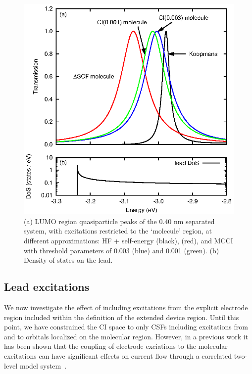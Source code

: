 \begin{figure}
	\begin{center}
		\includegraphics[width=0.9\linewidth]{figures/figure7a_7b}
	\end{center}
	\caption{(a) LUMO region quasiparticle peaks of the 0.40 nm separated
	         system, with excitations restricted to the `molecule' region,
		 at different approximations: HF + self-energy (black),
		 \dscf (red), and MCCI with threshold parameters of
		 0.003 (blue) and 0.001 (green). (b) Density of states on the
		 lead.}
	\label{fig:all40Alumo}
\end{figure}

\subsection{Lead excitations}
We now investigate the effect of including excitations from the
explicit electrode region included within the definition of the extended
device region. Until this point, we have constrained the CI space to only
\acp{CSF} including excitations from and to orbitals localized on the
molecular region. However, in a previous work it has been shown that the
coupling of electrode exciations to the molecular excitations can have
significant effects on current flow through a correlated two-level model
system~\cite{galperin_nitzan2006leadexcitations}. 

